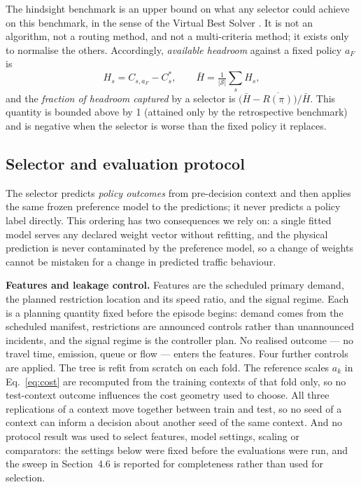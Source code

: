 \documentclass[10pt,a4paper]{article}
\begin{document}
The hindsight benchmark is an upper bound on what any selector could achieve on this benchmark, in the sense of the Virtual Best Solver \cite{R09}. It is not an algorithm, not a routing method, and not a multi-criteria method; it exists only to normalise the others. Accordingly, \emph{available headroom} against a fixed policy $a_F$ is
\begin{equation}
H_s=C_{s,a_F}-C^*_s ,\qquad \bar H=\tfrac1{|\mathcal S|}\textstyle\sum_s H_s ,
\label{eq:headroom}
\end{equation}
and the \emph{fraction of headroom captured} by a selector is $\big(\bar H-\overline{R(\pi_{\widehat{}})}\big)/\bar H$. This quantity is bounded above by 1 (attained only by the retrospective benchmark) and is negative when the selector is worse than the fixed policy it replaces.

\subsection{Selector and evaluation protocol}
The selector predicts \emph{policy outcomes} from pre-decision context and then applies the same frozen preference model to the predictions; it never predicts a policy label directly. This ordering has two consequences we rely on: a single fitted model serves any declared weight vector without refitting, and the physical prediction is never contaminated by the preference model, so a change of weights cannot be mistaken for a change in predicted traffic behaviour.

\textbf{Features and leakage control.} Features are the scheduled primary demand, the planned restriction location and its speed ratio, and the signal regime. Each is a planning quantity fixed before the episode begins: demand comes from the scheduled manifest, restrictions are announced controls rather than unannounced incidents, and the signal regime is the controller plan. No realised outcome --- no travel time, emission, queue or flow --- enters the features. Four further controls are applied. The tree is refit from scratch on each fold. The reference scales $a_k$ in Eq.~\eqref{eq:cost} are recomputed from the training contexts of that fold only, so no test-context outcome influences the cost geometry used to choose. All three replications of a context move together between train and test, so no seed of a context can inform a decision about another seed of the same context. And no protocol result was used to select features, model settings, scaling or comparators: the settings below were fixed before the evaluations were run, and the sweep in Section~4.6 is reported for completeness rather than used for selection.
\end{document}
